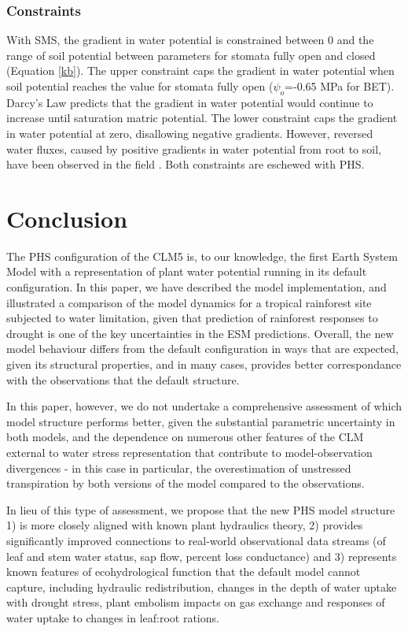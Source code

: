 \documentclass[draft,linenumbers]{agujournal}
\begin{document}
    \subsubsection{Constraints}
    With SMS, the gradient in water potential is constrained between 0 and the range of soil potential between parameters for stomata fully open and closed (Equation \ref{kb}). The upper constraint caps the gradient in water potential when soil potential reaches the value for stomata fully open ($\psi_o$=-0.65 MPa for BET). Darcy's Law predicts that the gradient in water potential would continue to increase until saturation matric potential. The lower constraint caps the gradient in water potential at zero, disallowing negative gradients. However, reversed water fluxes, caused by positive gradients in water potential from root to soil, have been observed in the field \citep{burgess1998}. Both constraints are eschewed with PHS.     

\section{Conclusion}



    The PHS configuration of the CLM5 is, to our knowledge, the first Earth System Model with a representation of plant water potential running in its default configuration. In this paper, we have described the model implementation, and illustrated a comparison of the model dynamics for a tropical rainforest site subjected to water limitation, given that prediction of rainforest responses to drought is one of the key uncertainties in the ESM predictions. Overall, the new model behaviour differs from the default configuration in ways that are expected, given its structural properties, and in many cases, provides better correspondance with the observations that the default structure. 
    
    In this paper, however, we do not undertake a comprehensive assessment of which model structure performs better, given the substantial parametric uncertainty in both models, and the dependence on numerous other features of the CLM external to water stress representation that contribute to model-observation divergences - in this case in particular, the overestimation of unstressed transpiration by both versions of the model compared to the observations. 
    
    In lieu of this type of assessment, we propose that the new PHS model structure 1) is more closely aligned with known plant hydraulics theory, 2) provides significantly improved connections to real-world observational data streams (of leaf and stem water status, sap flow, percent loss conductance) and 3) represents known features of ecohydrological function that the default model cannot capture, including hydraulic redistribution, changes in the depth of water uptake with drought stress, plant embolism impacts on gas exchange and responses of water uptake to changes in leaf:root rations. 
    
\end{document}
